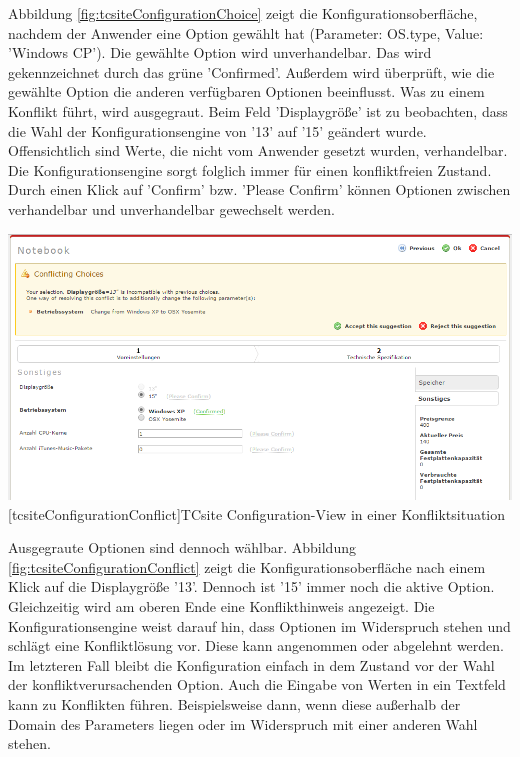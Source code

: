 \documentclass[12pt,a4paper,bibliography=totocnumbered,listof=totoc]{scrartcl}
\begin{document}
Abbildung \ref{fig:tcsiteConfigurationChoice} zeigt die Konfigurationsoberfläche, nachdem der Anwender eine Option gewählt hat (Parameter: OS.type, Value: 'Windows CP'). Die gewählte Option wird \glqq unverhandelbar\grqq{}. Das wird gekennzeichnet durch das grüne 'Confirmed'. Außerdem wird überprüft, wie die gewählte Option die anderen verfügbaren Optionen beeinflusst. Was zu einem Konflikt führt, wird ausgegraut. Beim Feld 'Displaygröße' ist zu beobachten, dass die Wahl der Konfigurationsengine von '13' auf '15' geändert wurde. Offensichtlich sind Werte, die nicht vom Anwender gesetzt wurden, \glqq verhandelbar\grqq{}. Die Konfigurationsengine sorgt folglich immer für einen konfliktfreien Zustand. Durch einen Klick auf 'Confirm' bzw. 'Please Confirm' können Optionen zwischen verhandelbar und unverhandelbar gewechselt werden.

\vspace{1em}
\begin{minipage}{\linewidth}
	\centering
	\includegraphics[width=0.8\linewidth]{Abbildungen/tcsiteConfigurationConflict.PNG}
	[tcsiteConfigurationConflict]{TCsite Configuration-View in einer Konfliktsituation}
	\label{fig:tcsiteConfigurationConflict}
\end{minipage}
\vspace{1em}

Ausgegraute Optionen sind dennoch wählbar. Abbildung \ref{fig:tcsiteConfigurationConflict} zeigt die Konfigurationsoberfläche nach einem Klick auf die Displaygröße '13'. Dennoch ist '15' immer noch die aktive Option. Gleichzeitig wird am oberen Ende eine Konflikthinweis angezeigt. Die Konfigurationsengine weist darauf hin, dass Optionen im Widerspruch stehen und schlägt eine Konfliktlösung vor. Diese kann angenommen oder abgelehnt werden. Im letzteren Fall bleibt die Konfiguration einfach in dem Zustand vor der Wahl der konfliktverursachenden Option. Auch die Eingabe von Werten in ein Textfeld kann zu Konflikten führen. Beispielsweise dann, wenn diese außerhalb der Domain des Parameters liegen oder im Widerspruch mit einer anderen Wahl stehen. 
\end{document}
